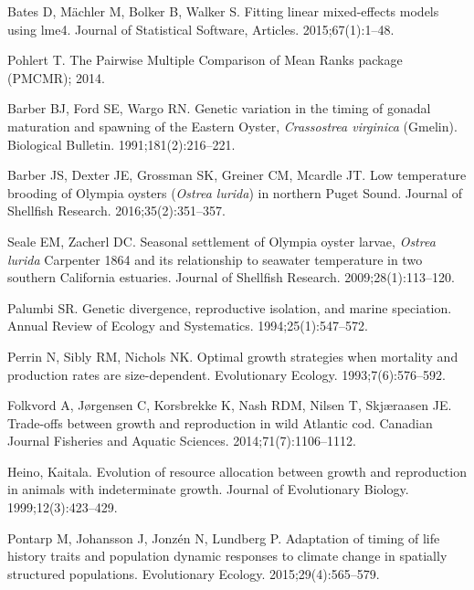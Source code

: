 \documentclass[10pt,letterpaper]{article}
\begin{document}
\begin{thebibliography}{10}
Bates D, M{\"a}chler M, Bolker B, Walker S.
\newblock Fitting linear mixed-effects models using lme4.
\newblock Journal of Statistical Software, Articles. 2015;67(1):1--48.

Pohlert T. The Pairwise Multiple Comparison of Mean Ranks package ({PMCMR});
  2014.

Barber BJ, Ford SE, Wargo RN.
\newblock Genetic variation in the timing of gonadal maturation and spawning of
  the Eastern Oyster, \textit{Crassostrea virginica} (Gmelin).
\newblock Biological Bulletin. 1991;181(2):216--221.

Barber JS, Dexter JE, Grossman SK, Greiner CM, Mcardle JT.
\newblock Low temperature brooding of Olympia oysters (\textit{Ostrea lurida})
  in northern Puget Sound.
\newblock Journal of Shellfish Research. 2016;35(2):351--357.

Seale EM, Zacherl DC.
\newblock Seasonal settlement of Olympia oyster larvae, \textit{Ostrea lurida}
  Carpenter 1864 and its relationship to seawater temperature in two southern
  California estuaries.
\newblock Journal of Shellfish Research. 2009;28(1):113--120.

Palumbi SR.
\newblock Genetic divergence, reproductive isolation, and marine speciation.
\newblock Annual Review of Ecology and Systematics. 1994;25(1):547--572.

Perrin N, Sibly RM, Nichols NK.
\newblock Optimal growth strategies when mortality and production rates are
  size-dependent.
\newblock Evolutionary Ecology. 1993;7(6):576--592.

Folkvord A, J{\o}rgensen C, Korsbrekke K, Nash RDM, Nilsen T, Skj{\ae}raasen
  JE.
\newblock Trade-offs between growth and reproduction in wild Atlantic cod.
\newblock Canadian Journal Fisheries and Aquatic Sciences. 2014;71(7):1106--1112.

{Heino}, {Kaitala}.
\newblock Evolution of resource allocation between growth and reproduction in
  animals with indeterminate growth.
\newblock Journal of Evolutionary Biology. 1999;12(3):423--429.

Pontarp M, Johansson J, Jonz{\'e}n N, Lundberg P.
\newblock Adaptation of timing of life history traits and population dynamic
  responses to climate change in spatially structured populations.
\newblock Evolutionary Ecology. 2015;29(4):565--579.


\end{thebibliography}
\end{document}
